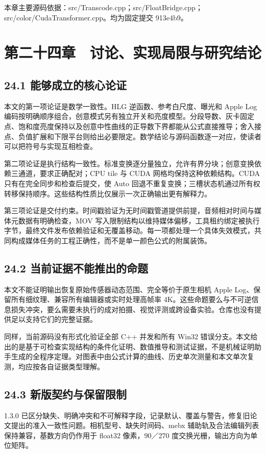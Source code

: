 \documentclass[UTF8,zihao=-4,openany]{ctexbook}
\begin{document}
\par\small 本章主要源码依据：src/Transcode.cpp；src/FloatBridge.cpp；src/color/CudaTransformer.cpp。均为固定提交 913e4b9。\normalsize

\chapter*{第二十四章　讨论、实现局限与研究结论}

\section*{24.1 能够成立的核心论证}
本文的第一项论证是数学一致性。HLG 逆函数、参考白尺度、曝光和 Apple Log 编码按明确顺序组合，创意模式另有独立开关和亮度模型。分段导数、灰卡固定点、饱和度亮度保持以及创意中性曲线的正导数下界都能从公式直接推导；舍入接点、负值扩展和下限平台则给出必要限定。数学结论与源码函数逐一对应，使读者可以把符号与实现互相检查。

第二项论证是执行结构一致性。标准变换逐分量独立，允许有界分块；创意变换依赖三通道，要求正确配对；CPU tile 与 CUDA 网格均保持这种依赖结构。CUDA 只有在完全同步和检查后提交，使 Auto 回退不重复变换；三槽状态机通过所有权转移保持顺序。这些结构性质比仅展示一次正确输出更有解释力。

第三项论证是交付约束。时间戳验证为无时间戳管道提供前提，音频相对时间与媒体元数据有明确检查，MOV 写入限制结构以维持媒体偏移，工具租约绑定被执行字节，最终文件发布依赖验证和无覆盖移动。每一项都处理一个具体失效模式，共同构成媒体任务的工程正确性，而不是单一颜色公式的附属装饰。


\section*{24.2 当前证据不能推出的命题}
本文不能证明输出恢复原始传感器动态范围、完全等价于原生相机 Apple Log、保留所有细纹理、兼容所有编辑器或实时处理高帧率 4K。这些命题要么与不可逆信息损失冲突，要么需要未执行的成对拍摄、视觉评测或跨设备实验。仓库也没有提供足以支持它们的完整证据。

同样，当前源码没有形式化验证全部 C++ 并发和所有 Win32 错误分支。本文给出的是基于可检查实现结构的条件化证明、数值推导和测试证据，不是机械证明助手生成的全程序定理。对图表中由公式计算的曲线、历史单次测量和本文单次复测，均应按各自证据类型理解。


\section*{24.3 新版契约与保留限制}
1.3.0 已区分缺失、明确冲突和不可解释字段，记录默认、覆盖与警告，修复旧论文提出的准入一致性问题。相机型号、缺失时间码、mebx 辅助轨及合法编辑列表保持兼容，基数方向仍作用于 float32 像素，90／270 度交换光栅，输出方向为单位矩阵。
\end{document}
